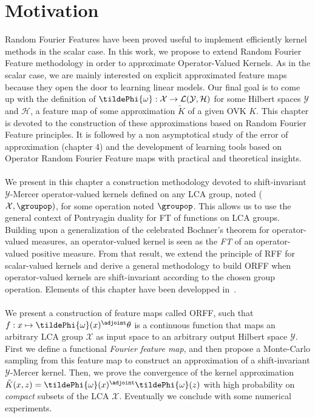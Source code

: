 
\section{Motivation}
\label{sec:motivations}
Random Fourier Features have been proved useful to implement efficiently kernel
methods in the scalar case. In this work, we propose to extend Random Fourier
Feature methodology in order to approximate Operator-Valued Kernels. As in the
scalar case, we are mainly interested on explicit approximated feature maps
because they open the door to learning linear models. Our final goal is to come
up with the definition of $\tildePhi{\omega}: \mathcal{X} \to
\mathcal{L}(\mathcal{Y},\mathcal{H})$ for some Hilbert spaces $\mathcal{Y}$ and
$\mathcal{H}$, a feature map of some approximation $\widetilde{K}$ of a given
\acs{OVK} $K$.  This chapter is devoted to the construction of these
approximations based on Random Fourier Feature principles. It is followed by a
non asymptotical study of the error of approximation (chapter 4) and the
development of learning tools based on Operator Random Fourier Feature maps
with practical and theoretical insights.


\paragraph{}
We present in this chapter a construction methodology devoted to
shift-invariant $\mathcal{Y}$-Mercer operator-valued kernels defined on any
\acf{LCA} group, noted ($\mathcal{X}, \groupop)$, for some operation noted
$\groupop$. This allows us to use the general context of Pontryagin duality for
\acl{FT} of functions on \acs{LCA} groups. Building upon a generalization of
the celebrated Bochner's theorem for operator-valued measures, an
operator-valued kernel is seen as the \emph{\acl{FT}} of an operator-valued
positive measure. From that result, we extend the principle of \acs{RFF} for
scalar-valued kernels and derive a general methodology to build \acf{ORFF} when
operator-valued kernels are shift-invariant according to the chosen group
operation. Elements of this chapter have been developped
in~\citet{brault2016random}.

\paragraph{}
We present a construction of feature maps called \acf{ORFF}, such that $f:
x\mapsto \tildePhi{\omega}(x)^\adjoint \theta$ is a continuous function that
maps an arbitrary \acs{LCA} group $\mathcal{X}$ as input space to an arbitrary
output Hilbert space $\mathcal{Y}$. First we define a functional \emph{Fourier
feature map}, and then propose a Monte-Carlo sampling from this feature map to
construct an approximation of a shift-invariant $\mathcal{Y}$-Mercer kernel.
Then, we prove the convergence of the kernel approximation
$\tilde{K}(x,z)=\tildePhi{\omega}(x)^\adjoint \tildePhi{\omega}(z)$ with high
probability on \emph{compact} subsets of the \acs{LCA} $\mathcal{X}$.
Eventually we conclude with some numerical experiments.

